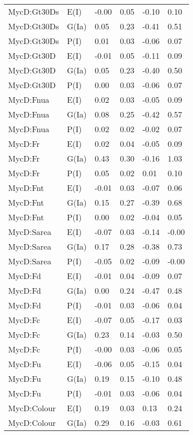 \begin{center}
\begin{longtable}{|p{1.1in}|p{0.7in}|p{0.7in}|p{0.6in}|p{0.6in}|p{0.6in}|}
  MycD:Gt30Ds & E(I) & -0.00 & 0.05 & -0.10 & 0.10 \\ 
  MycD:Gt30Ds & G(Ia) & 0.05 & 0.23 & -0.41 & 0.51 \\ 
  MycD:Gt30Ds & P(I) & 0.01 & 0.03 & -0.06 & 0.07 \\ 
  MycD:Gt30D & E(I) & -0.01 & 0.05 & -0.11 & 0.09 \\ 
  MycD:Gt30D & G(Ia) & 0.05 & 0.23 & -0.40 & 0.50 \\ 
  MycD:Gt30D & P(I) & 0.00 & 0.03 & -0.06 & 0.07 \\ 
  MycD:Fnua & E(I) & 0.02 & 0.03 & -0.05 & 0.09 \\ 
  MycD:Fnua & G(Ia) & 0.08 & 0.25 & -0.42 & 0.57 \\ 
  MycD:Fnua & P(I) & 0.02 & 0.02 & -0.02 & 0.07 \\ 
  MycD:Fr & E(I) & 0.02 & 0.04 & -0.05 & 0.09 \\ 
  MycD:Fr & G(Ia) & 0.43 & 0.30 & -0.16 & 1.03 \\ 
  MycD:Fr & P(I) & 0.05 & 0.02 & 0.01 & 0.10 \\ 
  MycD:Fnt & E(I) & -0.01 & 0.03 & -0.07 & 0.06 \\ 
  MycD:Fnt & G(Ia) & 0.15 & 0.27 & -0.39 & 0.68 \\ 
  MycD:Fnt & P(I) & 0.00 & 0.02 & -0.04 & 0.05 \\ 
  MycD:Sarea & E(I) & -0.07 & 0.03 & -0.14 & -0.00 \\ 
  MycD:Sarea & G(Ia) & 0.17 & 0.28 & -0.38 & 0.73 \\ 
  MycD:Sarea & P(I) & -0.05 & 0.02 & -0.09 & -0.00 \\ 
  MycD:Fd & E(I) & -0.01 & 0.04 & -0.09 & 0.07 \\ 
  MycD:Fd & G(Ia) & 0.00 & 0.24 & -0.47 & 0.48 \\ 
  MycD:Fd & P(I) & -0.01 & 0.03 & -0.06 & 0.04 \\ 
  MycD:Fc & E(I) & -0.07 & 0.05 & -0.17 & 0.03 \\ 
  MycD:Fc & G(Ia) & 0.23 & 0.14 & -0.03 & 0.50 \\ 
  MycD:Fc & P(I) & -0.00 & 0.03 & -0.06 & 0.05 \\ 
  MycD:Fu & E(I) & -0.06 & 0.05 & -0.15 & 0.04 \\ 
  MycD:Fu & G(Ia) & 0.19 & 0.15 & -0.10 & 0.48 \\ 
  MycD:Fu & P(I) & -0.01 & 0.03 & -0.06 & 0.04 \\ 
  MycD:Colour & E(I) & 0.19 & 0.03 & 0.13 & 0.24 \\ 
  MycD:Colour & G(Ia) & 0.29 & 0.16 & -0.03 & 0.61 \\ 

\end{longtable}
\end{center}
